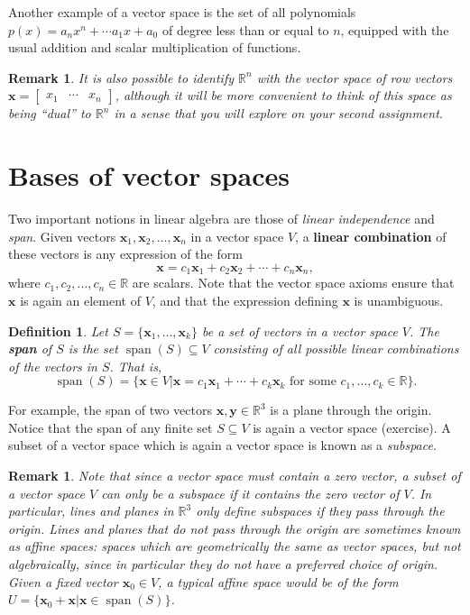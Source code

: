 \documentclass[12pt,letterpaper]{article}
\newtheorem{defn}[theorem]{Definition}
\newenvironment{definition}{\begin{defn}\rm}{\end{defn}}
\newtheorem{rem}[theorem]{Remark}
\newenvironment{remark}{\begin{rem}\rm}{\end{rem}}
\newcommand{\R}{\mathbb{R}}
\newcommand{\x}{\mathbf{x}}
\newcommand{\y}{\mathbf{y}}
\DeclareMathOperator{\spn}{span}
\begin{document}
Another example of a vector space is the set of all polynomials $p(x) = a_nx^n+\cdots a_1x+a_0$ of degree less than or equal to $n$, equipped with the usual addition and scalar multiplication of functions.
\begin{remark}
It is also possible to identify $\R^n$ with the vector space of {\em row} vectors $\x = \begin{bmatrix}
x_1 & \cdots & x_n
\end{bmatrix}$, although it will be more convenient to think of this space as being ``dual'' to $\R^n$ in a sense that you will explore on your second assignment.
\end{remark}

\section{Bases of vector spaces}
Two important notions in linear algebra are those of {\em linear independence} and {\em span}. Given vectors $\x_1, \x_2, \ldots, \x_n$ in a vector space $V$, a {\bf linear combination} of these vectors is any expression of the form
\[
\x = c_1\x_1+c_2\x_2+\cdots +c_n\x_n,
\]
where $c_1, c_2, \ldots, c_n\in \R$ are scalars. Note that the vector space axioms ensure that $\x$ is again an element of $V$, and that the expression defining $\x$ is unambiguous.

\begin{definition}
Let $S=\{\x_1,\ldots,\x_k\}$ be a set of vectors in a vector space $V$. The {\bf span} of $S$ is the set $\spn(S)\subseteq V$ consisting of all possible linear combinations of the vectors in $S$. That is,
\[
\spn(S) = \{\x\in V| \x = c_1\x_1+\cdots +c_k\x_k \text{ for some } c_1,\ldots, c_k\in \R\}.
\]
\end{definition}
For example, the span of two vectors $\x,\y\in \R^3$ is a plane through the origin. Notice that the span of any finite set $S\subseteq V$ is again a vector space (exercise). A subset of a vector space which is again a vector space is known as a {\em subspace}.

\begin{remark}\label{re}
Note that since a vector space must contain a zero vector, a subset of a vector space $V$ can only be a subspace if it contains the zero vector of $V$. In particular, lines and planes in $\R^3$ only define subspaces if they pass through the origin. Lines and planes that do not pass through the origin are sometimes known as {\em affine} spaces: spaces which are {\em geometrically} the same as vector spaces, but not {\em algebraically}, since in particular they do not have a preferred choice of origin. Given a fixed vector $\x_0\in V$, a typical affine space would be of the form $U=\{\x_0+\x|\x\in\spn(S)\}$.
\end{remark}
\end{document}

